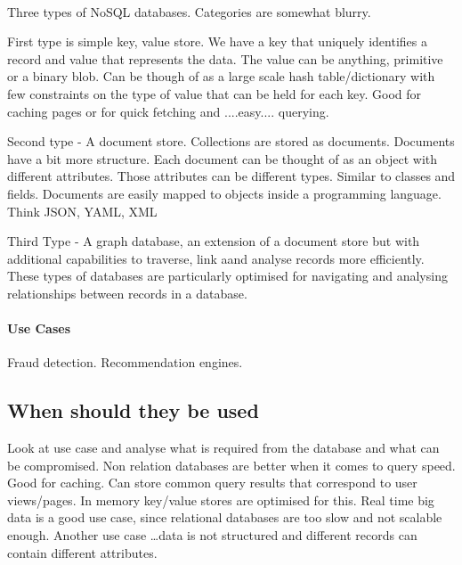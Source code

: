 \documentclass[a4paper, 11pt]{book}
\begin{document}
    \paragraph{}
    Three types of NoSQL databases. Categories are somewhat blurry.

    First type is simple key, value store. We have a key that uniquely identifies a record and value that represents the data.
    The value can be anything, primitive or a binary blob.
    Can be though of as a large scale hash table/dictionary with few constraints on the type of value that can be held for each key.
    Good for caching pages or for quick fetching and ....easy.... querying.

    Second type - A document store. Collections are stored as documents. Documents have a bit more structure.
    Each document can be thought of as an object with different attributes.
    Those attributes can be different types.
    Similar to classes and fields.
    Documents are easily mapped to objects inside a programming language. Think JSON, YAML, XML

    Third Type - A graph database, an extension of a document store but with additional capabilities to traverse, link aand analyse records more efficiently.
    These types of databases are particularly optimised for navigating and analysing relationships between records in a database.

    \paragraph{Use Cases}
    Fraud detection.
    Recommendation engines.

    \subsection{When should they be used}
    Look at use case and analyse what is required from the database and what can be compromised.
    Non relation databases are better when it comes to query speed.
    Good for caching.
    Can store common query results that correspond to user views/pages.
    In memory key/value stores are optimised for this.
    Real time big data is a good use case, since relational databases are too slow and not scalable enough.
    Another use case \ldots data is not structured and different records can contain different attributes.
\end{document}
